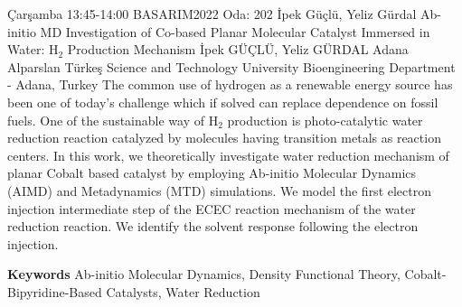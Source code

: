
    \begin{abstract_basarim}
    {Çarşamba 13:45-14:00}
    {BASARIM2022}
    {Oda: 202}
    {İpek Güçlü, Yeliz Gürdal}
    {Ab-initio MD Investigation of Co-based Planar Molecular Catalyst Immersed in Water: $\mathrm{H}_{2}$ Production Mechanism}
    {%
    İpek GÜÇLÜ, Yeliz GÜRDAL}
    {%
    }
    {%
    Adana Alparslan Türkeş Science and Technology University Bioengineering Department - Adana, Turkey}
    The common use of hydrogen as a renewable energy source has been one of today's challenge which if solved can replace dependence on fossil fuels. One of the sustainable way of $\mathrm{H}_{2}$ production is photo-catalytic water reduction reaction catalyzed by molecules having transition metals as reaction centers. In this work, we theoretically investigate water reduction mechanism of planar Cobalt based catalyst by employing Ab-initio Molecular Dynamics (AIMD) and Metadynamics (MTD) simulations. We model the first electron injection intermediate step of the ECEC reaction mechanism of the water reduction reaction. We identify the solvent response following the electron injection. 
    
        \textbf{Keywords} \newline{}Ab-initio Molecular Dynamics, Density Functional Theory, Cobalt-Bipyridine-Based Catalysts, Water Reduction
    \end{abstract_basarim}
    